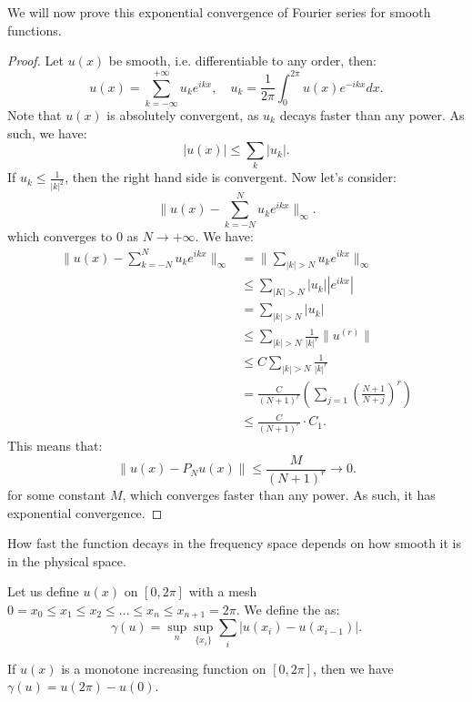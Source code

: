 \documentclass[../main/main.tex]{subfiles}
\begin{document}
    We will now prove this exponential convergence of Fourier series for smooth functions.
    \begin{proof}
        Let $u(x)$ be smooth, i.e. differentiable to any order, then: \[
            u(x) = \sum_{k=-\infty}^{+\infty}u_k e^{ikx}, \quad u_k = \frac{1}{2\pi} \int ^{2\pi}_0 u(x) e^{-ikx}dx
        .\] Note that $u(x)$ is absolutely convergent, as  $u_k$ decays faster than any power. As such, we have:  \[
        |u(x) | \le  \sum_k |u_k| 
        .\] If $u_k \le  \frac{1}{|k|^2}$, then the right hand side is convergent. Now let's consider: \[
        \|u(x) - \sum_{k=-N}^N u_k e^{ikx}\|_{\infty}
        .\] which converges to $0$ as $N\to  +\infty$. We have: 
        \begin{align*} 
        \|u(x) - \sum_{k=-N}^N u_k e^{ikx}\|_\infty &= \|\sum_{|k| > N}u_k e^{ikx}\|_\infty \\
        &\le \sum_{|K| > N} |u_k| |e^{ikx}| \\
        &= \sum_{|k| > N} |u_k| \\
        &\le  \sum_{|k| > N} \frac{1}{|k|^r} \|u^{(r)}\| \\
        &\le  C \sum_{|k| > N} \frac{1}{|k|^r} \\
        &= \frac{C}{(N+1)^r} \left( \sum_{j = 1} \left( \frac{N+1}{N+j} \right)^ r \right)  \\
        &\le  \frac{C}{(N+1)^r} \cdot  C_1
        .\end{align*}
        This means that: \[
            \|u(x) - P_Nu(x)\| \le  \frac{M}{(N+1)^r} \to  0
        .\] for some constant $M$, which converges faster than any power. As such, it has exponential convergence.
\end{proof}
         \begin{remark}
            How fast the function decays in the frequency space depends on how smooth it is in the physical space.
        \end{remark}
        \begin{definition}
            Let us define $u(x)$ on  $[0,2\pi]$ with a mesh $0=x_0\le  x_1 \le  x_2 \le  \ldots \le x_n \le  x_{n+1} = 2\pi$. We define the  as: \[
                \gamma(u) = \sup_n\sup_{\{x_i\} }\sum_i |u(x_i) - u(x_{i-1}) |
            .\] 
            
        \end{definition}
        \begin{example}
            If $u(x)$ is a monotone increasing function on  $[0,2\pi]$, then we have $\gamma(u) = u(2\pi) - u(0)$.
        \end{example}
\end{document}
